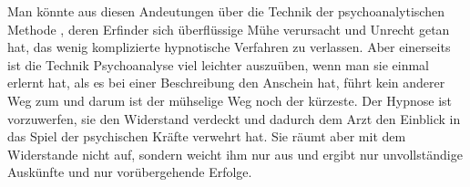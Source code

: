 \documentclass[twoside=true,titlepage=false,open=any, parskip=never, fontsize=10pt, headings=small, chapterprefix=false, appendixprefix=false]{scrbook}
\begin{document}
            
        \pstart
        Man könnte aus diesen Andeutungen über die Technik der psychoanalytischen
               Methode ,  deren Erfinder sich überflüssige Mühe verursacht und Unrecht getan hat,
               das wenig komplizierte hypnotische Verfahren zu verlassen. Aber einerseits
               ist die Technik  Psychoanalyse viel leichter auszuüben, wenn man sie einmal erlernt hat,
               als es bei einer Beschreibung den Anschein hat,  führt kein anderer Weg zum  und darum ist der mühselige Weg noch der kürzeste. Der Hypnose ist
               vorzuwerfen,  sie den Widerstand verdeckt und dadurch dem Arzt den Einblick in das
               Spiel der psychischen Kräfte verwehrt hat. Sie räumt aber mit dem Widerstande nicht auf, sondern weicht
               ihm nur aus und ergibt  nur unvollständige Auskünfte und nur vorübergehende
               Erfolge.
        \pend
    
\end{document}
